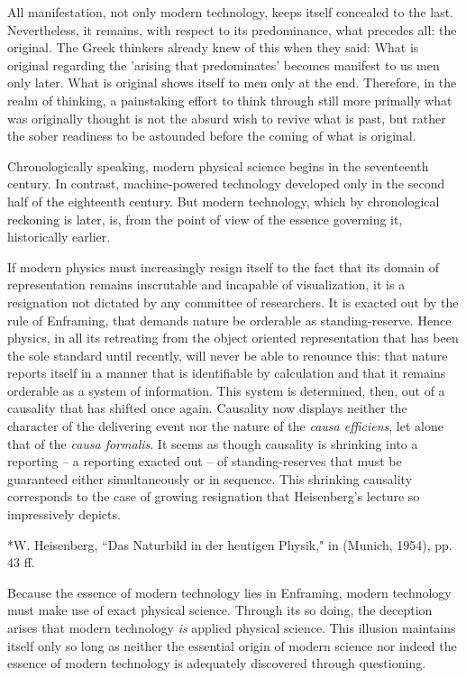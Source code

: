 All manifestation, not only modern technology, keeps itself concealed to the last. Nevertheless, it remains, with respect to its predominance, what precedes all: the original. The Greek thinkers already knew of this when they said: What is original regarding the 'arising that predominates' becomes manifest to us men only later. What is original shows itself to men only at the end. Therefore, in the realm of thinking, a painstaking effort to think through still more primally what was originally thought is not the absurd wish to revive what is past, but rather the sober readiness to be astounded before the coming of what is original.

Chronologically speaking, modern physical science begins in the seventeenth century. In contrast, machine-powered technology developed only in the second half of the eighteenth century. But modern technology, which by chronological reckoning is later, is, from the point of view of the essence governing it, historically earlier.

If modern physics must increasingly resign itself to the fact that its domain of representation remains inscrutable and incapable of visualization, it is a resignation not dictated by any committee of researchers. It is exacted out by the rule of Enframing, that demands nature be orderable as standing-reserve. Hence physics, in all its retreating from the object oriented representation that has been the sole standard until recently, will never be able to renounce this: that nature reports itself in a manner that is identifiable by calculation and that it remains orderable as a system of information. This system is determined, then, out of a causality that has shifted once again. Causality now displays neither the character of the delivering event nor the nature of the \textit{causa efficiens}, let alone that of the \textit{causa formalis}. It seems as though causality is shrinking into a reporting -- a reporting exacted out -- of standing-reserves that must be guaranteed either simultaneously or in sequence.  This shrinking causality corresponds to the case of growing resignation that Heisenberg's lecture so impressively depicts.

*W. Heisenberg, ``Das Naturbild in der heutigen Physik," in  (Munich, 1954), pp. 43 ff.

Because the essence of modern technology lies in Enframing, modern technology must make use of exact physical science. Through its so doing, the deception arises that modern technology \textit{is} applied physical science. This illusion maintains itself only so long as neither the essential origin of modern science nor indeed the essence of modern technology is adequately discovered through questioning.

